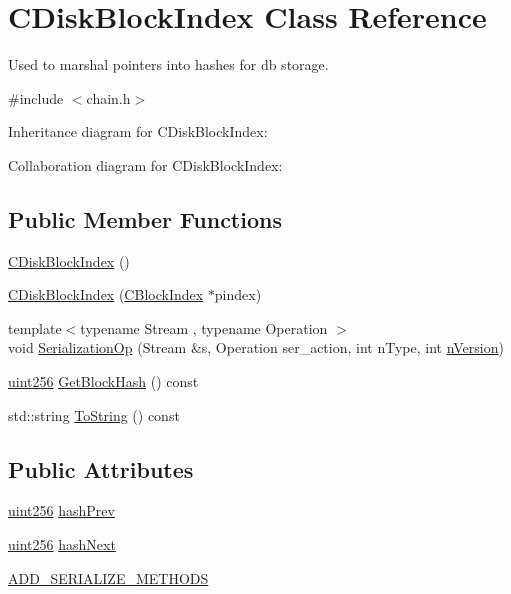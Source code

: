 \hypertarget{class_c_disk_block_index}{}\section{C\+Disk\+Block\+Index Class Reference}
\label{class_c_disk_block_index}


Used to marshal pointers into hashes for db storage.  




{\ttfamily \#include $<$chain.\+h$>$}



Inheritance diagram for C\+Disk\+Block\+Index\+:


Collaboration diagram for C\+Disk\+Block\+Index\+:
\subsection*{Public Member Functions}
\begin{DoxyCompactItemize}
\item 
\hyperlink{class_c_disk_block_index_a8c460c63b799964ef55e2dbbb74b5ad6}{C\+Disk\+Block\+Index} ()
\item 
\hyperlink{class_c_disk_block_index_a1407006c4526260b57ec2d8b3abc707d}{C\+Disk\+Block\+Index} (\hyperlink{class_c_block_index}{C\+Block\+Index} $\ast$pindex)
\item 
{\footnotesize template$<$typename Stream , typename Operation $>$ }\\void \hyperlink{class_c_disk_block_index_a2ef7b51f2777fcc1b9625a0ee000f9b5}{Serialization\+Op} (Stream \&s, Operation ser\+\_\+action, int n\+Type, int \hyperlink{class_c_block_index_a45126301a0a6e26010527a7bbfc1ef58}{n\+Version})
\item 
\hyperlink{classuint256}{uint256} \hyperlink{class_c_disk_block_index_adbe404c55c68be782360b4594d355fad}{Get\+Block\+Hash} () const 
\item 
std\+::string \hyperlink{class_c_disk_block_index_a86ef9d71fb72868699145b73f3e3e583}{To\+String} () const 
\end{DoxyCompactItemize}
\subsection*{Public Attributes}
\begin{DoxyCompactItemize}
\item 
\hyperlink{classuint256}{uint256} \hyperlink{class_c_disk_block_index_a3a1730201a8523fb947c4d4f632a4212}{hash\+Prev}
\item 
\hyperlink{classuint256}{uint256} \hyperlink{class_c_disk_block_index_a0dda572f44335a5317de18001c3594a8}{hash\+Next}
\item 
\hyperlink{class_c_disk_block_index_adfa97e82f2e6db827fc6b8b5e351a1f9}{A\+D\+D\+\_\+\+S\+E\+R\+I\+A\+L\+I\+Z\+E\+\_\+\+M\+E\+T\+H\+O\+D\+S}
\end{DoxyCompactItemize}
